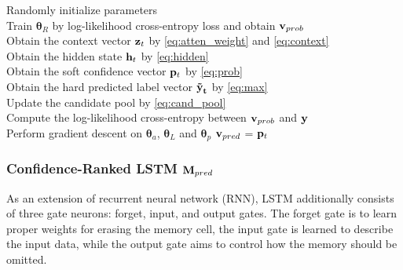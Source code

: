 \documentclass[letterpaper]{article} %
\begin{document}
{\color{blue}
\begin{algorithm}[t]
	\label{alg:training}
	\DontPrintSemicolon
	\caption{Training of Our Proposed Model}

    \BlankLine
	Randomly initialize parameters\\
    Train $\mathbf{\theta}_R$ by log-likelihood cross-entropy loss and obtain $\mathbf{\mathbf{v}}_{prob}$\\
	{
        {
        	Obtain the context vector $\mathbf{\mathbf{z}}_t$ by \eqref{eq:atten_weight} and \eqref{eq:context}\\
            Obtain the hidden state $\mathbf{\mathbf{h}}_t$ by \eqref{eq:hidden}\\
            Obtain the soft confidence vector $\mathbf{\mathbf{p}}_t$ by \eqref{eq:prob}\\
            Obtain the hard predicted label vector $\mathbf{\tilde{\textbf{y}}_t}$ by \eqref{eq:max}\\
            Update the candidate pool by \eqref{eq:cand_pool}\\
            Compute the log-likelihood cross-entropy between $\mathbf{\mathbf{v}}_{prob}$ and $\mathbf{\textbf{y}}$\\
            Perform gradient descent on $\mathbf{\theta}_a$, $\mathbf{\theta}_L$ and $\mathbf{\theta}_p$
            $\mathbf{\mathbf{v}}_{pred}$ = $\mathbf{\mathbf{p}}_t$
        }
    }
\end{algorithm}
}

\subsubsection{Confidence-Ranked LSTM $\mathbf{M}_{pred}$}
\label{LSTM}
As an extension of recurrent neural network (RNN), LSTM additionally consists of three gate neurons: forget, input, and output gates. The forget gate is to learn proper weights for erasing the memory cell, the input gate is learned to describe the input data, while the output gate aims to control how the memory should be omitted.
\end{document}

